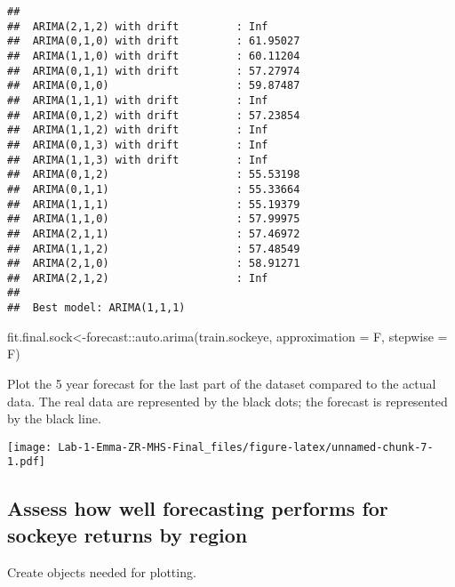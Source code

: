 \documentclass[
]{article}
\newenvironment{Shaded}{\begin{snugshade}}{\end{snugshade}}
\newcommand{\AttributeTok}[1]{\textcolor[rgb]{0.77,0.63,0.00}{#1}}
\newcommand{\FunctionTok}[1]{\textcolor[rgb]{0.00,0.00,0.00}{#1}}
\newcommand{\NormalTok}[1]{#1}
\newcommand{\OtherTok}[1]{\textcolor[rgb]{0.56,0.35,0.01}{#1}}
\newcommand{\SpecialCharTok}[1]{\textcolor[rgb]{0.00,0.00,0.00}{#1}}
\begin{document}
\begin{verbatim}
## 
##  ARIMA(2,1,2) with drift         : Inf
##  ARIMA(0,1,0) with drift         : 61.95027
##  ARIMA(1,1,0) with drift         : 60.11204
##  ARIMA(0,1,1) with drift         : 57.27974
##  ARIMA(0,1,0)                    : 59.87487
##  ARIMA(1,1,1) with drift         : Inf
##  ARIMA(0,1,2) with drift         : 57.23854
##  ARIMA(1,1,2) with drift         : Inf
##  ARIMA(0,1,3) with drift         : Inf
##  ARIMA(1,1,3) with drift         : Inf
##  ARIMA(0,1,2)                    : 55.53198
##  ARIMA(0,1,1)                    : 55.33664
##  ARIMA(1,1,1)                    : 55.19379
##  ARIMA(1,1,0)                    : 57.99975
##  ARIMA(2,1,1)                    : 57.46972
##  ARIMA(1,1,2)                    : 57.48549
##  ARIMA(2,1,0)                    : 58.91271
##  ARIMA(2,1,2)                    : Inf
## 
##  Best model: ARIMA(1,1,1)
\end{verbatim}

\begin{Shaded}
\begin{Highlighting}[]
\NormalTok{fit.final.sock}\OtherTok{\textless{}{-}}\NormalTok{forecast}\SpecialCharTok{::}\FunctionTok{auto.arima}\NormalTok{(train.sockeye, }\AttributeTok{approximation =}\NormalTok{ F, }\AttributeTok{stepwise =}\NormalTok{ F)}
\end{Highlighting}
\end{Shaded}

Plot the 5 year forecast for the last part of the dataset compared to
the actual data. The real data are represented by the black dots; the
forecast is represented by the black line.

\texttt{[image: Lab-1-Emma-ZR-MHS-Final\_files/figure-latex/unnamed-chunk-7-1.pdf]}

\hypertarget{assess-how-well-forecasting-performs-for-sockeye-returns-by-region}{%
\subsection{Assess how well forecasting performs for sockeye returns by
region}\label{assess-how-well-forecasting-performs-for-sockeye-returns-by-region}}

Create objects needed for plotting.
\end{document}
